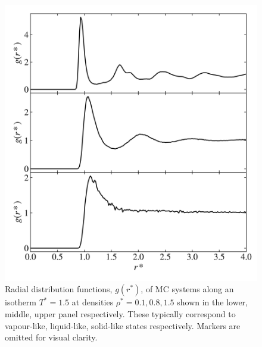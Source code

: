 \documentclass[10pt, twocolumn]{revtex4}    %
\begin{document}

\begin{figure}
	\includegraphics[width=\linewidth]{figures/rdfs/RDFs.png}
	\caption{Radial distribution functions, $g(r^{*})$, of MC systems along an isotherm $T^{*}=1.5$ at densities $\rho{}^{*}=0.1, 0.8, 1.5$ shown in the lower, middle, upper panel respectively. These typically correspond to vapour-like, liquid-like, solid-like states respectively. Markers are omitted for visual clarity.}
	\label{fig:RDFs}
\end{figure}
\end{document}
